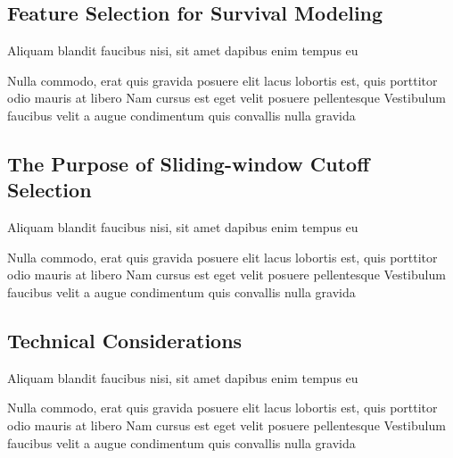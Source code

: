 \documentclass[
paper=landscape,
paper=160mm:90mm, %
fontsize=11pt, %
pagesize, %
parskip=half-, %
]{scrartcl} %
\theoremstyle{mythmstyle} %
\begin{document}
\clearpage

\subsection{Feature Selection for Survival Modeling} %

\begin{outline}

\1 Aliquam blandit faucibus nisi, sit amet dapibus enim tempus eu

\2 Nulla commodo, erat quis gravida posuere
\1 elit lacus lobortis est, quis porttitor odio mauris at libero
\1 Nam cursus est eget velit posuere pellentesque
\1 Vestibulum faucibus velit a augue condimentum quis convallis nulla gravida

\end{outline}


\clearpage

\subsection{The Purpose of Sliding-window Cutoff Selection}

\begin{outline}

\1 Aliquam blandit faucibus nisi, sit amet dapibus enim tempus eu

\2 Nulla commodo, erat quis gravida posuere
\1 elit lacus lobortis est, quis porttitor odio mauris at libero
\1 Nam cursus est eget velit posuere pellentesque
\1 Vestibulum faucibus velit a augue condimentum quis convallis nulla gravida

\end{outline}


\clearpage

\subsection{Technical Considerations}

\begin{outline}

\1 Aliquam blandit faucibus nisi, sit amet dapibus enim tempus eu

\2 Nulla commodo, erat quis gravida posuere
\1 elit lacus lobortis est, quis porttitor odio mauris at libero
\1 Nam cursus est eget velit posuere pellentesque
\1 Vestibulum faucibus velit a augue condimentum quis convallis nulla gravida

\end{outline}
\end{document}

